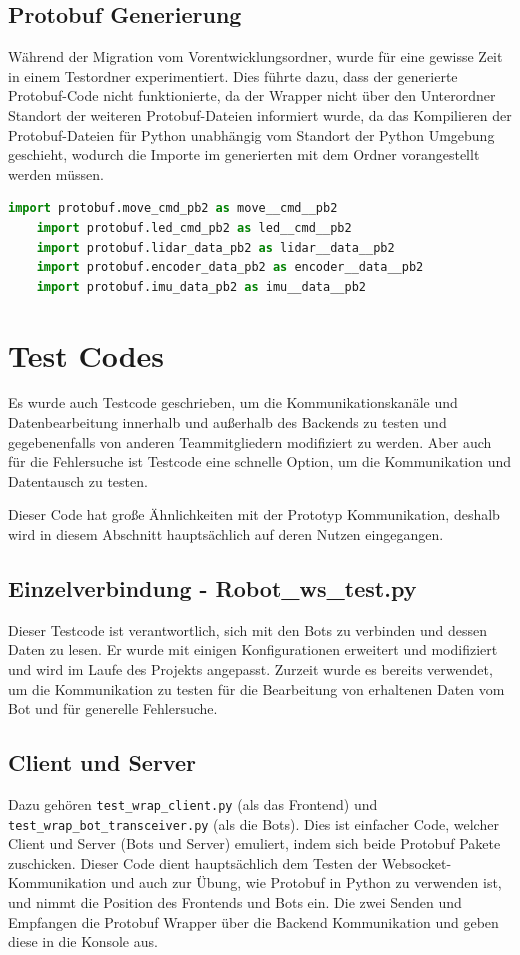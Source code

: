 \subsection{Protobuf Generierung}
Während der Migration vom Vorentwicklungsordner, 
wurde für eine gewisse Zeit in einem Testordner experimentiert.
Dies führte dazu, dass der generierte Protobuf-Code nicht funktionierte,
da der Wrapper nicht über den Unterordner Standort  
der weiteren Protobuf-Dateien informiert wurde,
da das Kompilieren der Protobuf-Dateien für Python unabhängig vom Standort
der Python Umgebung geschieht, 
wodurch die Importe im generierten 
mit dem Ordner vorangestellt werden müssen.

\begin{lstlisting}[language=python, gobble=4]
    import protobuf.move_cmd_pb2 as move__cmd__pb2
    import protobuf.led_cmd_pb2 as led__cmd__pb2
    import protobuf.lidar_data_pb2 as lidar__data__pb2
    import protobuf.encoder_data_pb2 as encoder__data__pb2
    import protobuf.imu_data_pb2 as imu__data__pb2
\end{lstlisting}


\section{Test Codes}
Es wurde auch Testcode geschrieben, 
um die Kommunikationskanäle und Datenbearbeitung innerhalb 
und außerhalb des Backends zu testen und gegebenenfalls 
von anderen Teammitgliedern modifiziert zu werden.
% 
Aber auch für die Fehlersuche ist Testcode eine schnelle Option, 
um die Kommunikation und Datentausch zu testen.

Dieser Code hat große Ähnlichkeiten mit der Prototyp Kommunikation, 
deshalb wird in diesem Abschnitt hauptsächlich auf deren Nutzen eingegangen.

\subsection{Einzelverbindung - Robot\_ws\_test.py}
Dieser Testcode ist verantwortlich, sich mit den Bots zu verbinden 
und dessen Daten zu lesen.
Er wurde mit einigen Konfigurationen erweitert und modifiziert 
und wird im Laufe des Projekts angepasst.
Zurzeit wurde es bereits verwendet, 
um die Kommunikation zu testen 
für die Bearbeitung von erhaltenen Daten vom Bot 
und für generelle Fehlersuche.

\subsection{Client und Server}
Dazu gehören \texttt{test\_wrap\_client.py} (als das Frontend) 
und \texttt{test\_wrap\_bot\_transceiver.py} (als die Bots).
Dies ist einfacher Code, welcher Client und Server (Bots und Server) emuliert, 
indem sich beide Protobuf Pakete zuschicken. 
Dieser Code dient hauptsächlich dem Testen der Websocket-Kommunikation 
und auch zur Übung, wie Protobuf in Python zu verwenden ist, 
und nimmt die Position des Frontends und Bots ein.
Die zwei Senden und Empfangen die Protobuf Wrapper über die Backend Kommunikation 
und geben diese in die Konsole aus.
